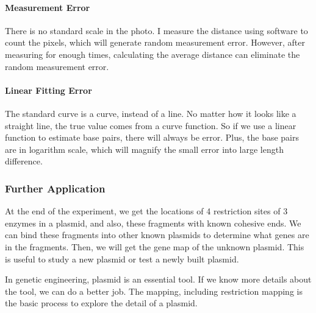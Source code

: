 \documentclass{article}
\begin{document}
                \paragraph{Measurement Error} There is no standard scale in the photo. I measure the distance using software to count the pixels, which will generate random measurement error. However, after measuring for enough times, calculating the average distance can eliminate the random measurement error.

                \paragraph{Linear Fitting Error} The standard curve is a curve, instead of a line. No matter how it looks like a straight line, the true value comes from a curve function. So if we use a linear function to estimate base pairs, there will always be error. Plus, the base pairs are in logarithm scale, which will magnify the small error into large length difference.

            \subsubsection{Further Application}
                At the end of the experiment, we get the locations of 4 restriction sites of 3 enzymes in a plasmid, and also, these fragments with known cohesive ends. We can bind these fragments into other known plasmids to determine what genes are in the fragments. Then, we will get the gene map of the unknown plasmid. This is useful to study a new plasmid or test a newly built plasmid. 

                In genetic engineering, plasmid is an essential tool. If we know more details about the tool, we can do a better job. The mapping, including restriction mapping is the basic process to explore the detail of a plasmid.
\end{document}
